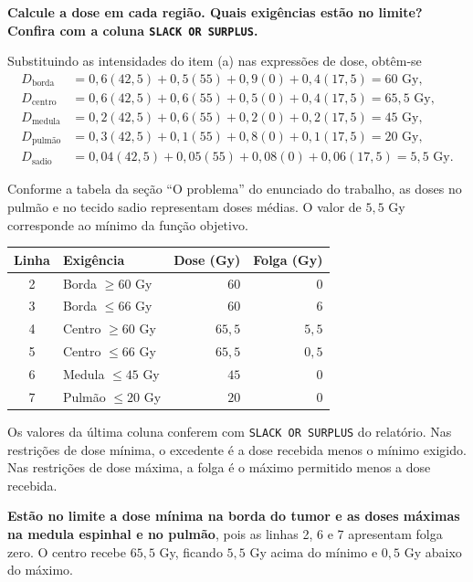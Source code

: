 \documentclass[12pt,a4paper]{article}
\begin{document}
\textbf{Calcule a dose em cada região. Quais exigências estão no limite?
Confira com a coluna \texttt{SLACK OR SURPLUS}.}

Substituindo as intensidades do item (a) nas expressões de dose, obtêm-se
\begin{align*}
D_{\text{borda}}
&=0{,}6(42{,}5)+0{,}5(55)+0{,}9(0)+0{,}4(17{,}5)
=60\text{ Gy},\\
D_{\text{centro}}
&=0{,}6(42{,}5)+0{,}6(55)+0{,}5(0)+0{,}4(17{,}5)
=65{,}5\text{ Gy},\\
D_{\text{medula}}
&=0{,}2(42{,}5)+0{,}6(55)+0{,}2(0)+0{,}2(17{,}5)
=45\text{ Gy},\\
D_{\text{pulmão}}
&=0{,}3(42{,}5)+0{,}1(55)+0{,}8(0)+0{,}1(17{,}5)
=20\text{ Gy},\\
D_{\text{sadio}}
&=0{,}04(42{,}5)+0{,}05(55)+0{,}08(0)+0{,}06(17{,}5)
=5{,}5\text{ Gy}.
\end{align*}

Conforme a tabela da seção ``O problema'' do enunciado
do trabalho, as doses no pulmão e no tecido sadio
representam doses médias. O valor de $5{,}5$ Gy corresponde ao mínimo da função objetivo.

\begin{center}
\begin{tabular}{clrr}
\toprule
\textbf{Linha} & \textbf{Exigência} & \textbf{Dose (Gy)} & \textbf{Folga (Gy)} \\
\midrule
2 & Borda $\geq 60$ Gy & $60$ & $0$ \\
3 & Borda $\leq 66$ Gy & $60$ & $6$ \\
4 & Centro $\geq 60$ Gy & $65{,}5$ & $5{,}5$ \\
5 & Centro $\leq 66$ Gy & $65{,}5$ & $0{,}5$ \\
6 & Medula $\leq 45$ Gy & $45$ & $0$ \\
7 & Pulmão $\leq 20$ Gy & $20$ & $0$ \\
\bottomrule
\end{tabular}
\end{center}

Os valores da última coluna conferem com \texttt{SLACK OR SURPLUS}
do relatório. Nas restrições de dose mínima, o excedente é a dose
recebida menos o mínimo exigido. Nas restrições de dose máxima,
a folga é o máximo permitido menos a dose recebida.

\textbf{Estão no limite a dose mínima na borda do tumor e as doses
máximas na medula espinhal e no pulmão}, pois as linhas 2, 6 e 7
apresentam folga zero. O centro recebe $65{,}5$ Gy, ficando
$5{,}5$ Gy acima do mínimo e $0{,}5$ Gy abaixo do máximo.
\end{document}
